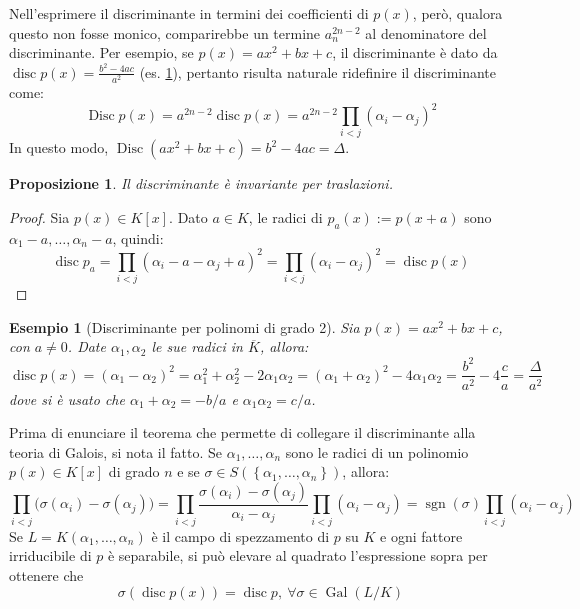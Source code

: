 \documentclass[12pt]{scrartcl}
\theoremstyle{style}
\newtheorem{esempio}{Esempio}[section]
\newtheorem{prop}{Proposizione}[section]
\numberwithin{equation}{subsection}
\begin{document}
Nell'esprimere il discriminante in termini dei coefficienti di $p(x)$, per\`o, qualora questo non fosse monico, comparirebbe un termine $a_n^{2n-2} $ al denominatore del discriminante.
Per esempio, se $p(x) = ax^2 + bx + c$, il discriminante \`e dato da $\operatorname{disc} p(x) = \frac{b^2 - 4ac}{a^2}$ (es. \ref{e36}), pertanto risulta naturale ridefinire il discriminante come:
\begin{equation}
	\operatorname{Disc} p(x) = a^{2n-2} \operatorname{disc} p(x) = a^{2n-2} \prod_{i<j} (\alpha _i-\alpha _j)^2
\end{equation}
In questo modo, $\operatorname{Disc} (ax^2 + bx+c) = b^2 - 4ac = \Delta $.
\begin{prop}
Il discriminante \`e invariante per traslazioni.
\end{prop}
\begin{proof}
	Sia $p(x) \in K[x]$. 
	Dato $a \in K$, le radici di $p_a(x) := p(x+a)$ sono $\alpha _1 - a, \ldots, \alpha _n-a$, quindi:
	\[
	\operatorname{disc} p_a = \prod_{i<j} (\alpha _i - a - \alpha _j + a)^2 = \prod_{i<j} (\alpha _i-\alpha _j)^2 = \operatorname{disc} p(x)
	\] 
\end{proof}
\begin{esempio}
	[Discriminante per polinomi di grado 2]\label{e36}
	Sia $p(x) =ax^2 + bx + c$, con $a\neq 0$.
	Date $\alpha _1, \alpha _2$ le sue radici in $\overline{K}$, allora:
	\[
	\operatorname{disc} p(x) = (\alpha _1-\alpha _2)^2 = \alpha _1^2 + \alpha _2^2 - 2 \alpha _1 \alpha _2 = (\alpha _1 + \alpha _2)^2 - 4 \alpha _1 \alpha _2 = \frac{b^2}{a^2}- 4 \frac{c}{a}=\frac{\Delta }{a^2}
	\] 
	dove si \`e usato che $\alpha _1 + \alpha _2 = -b /  a$ e $\alpha _1 \alpha _2 = c / a$.
\end{esempio}
\noindent Prima di enunciare il teorema che permette di collegare il discriminante alla teoria di Galois, si nota il fatto.
Se $\alpha _1,\ldots,\alpha _n$ sono le radici di un polinomio $p(x) \in K[x]$ di grado $n$ e se $\sigma \in S(\left\{ \alpha _1,\ldots,\alpha _n \right\} )$, allora:
\[
\prod_{i<j} \big(\sigma (\alpha _i)-\sigma (\alpha _j)\big) = \prod_{i<j} \frac{\sigma (\alpha _i) - \sigma (\alpha _j)}{\alpha _i-\alpha _j} \prod_{i<j} (\alpha _i-\alpha _j) = \operatorname{sgn} (\sigma ) \prod_{i<j} (\alpha _i-\alpha _j)
\] 
Se $L=K(\alpha _1,\ldots,\alpha _n)$ \`e il campo di spezzamento di $p$ su $K$ e ogni fattore irriducibile di $p$ \`e separabile, si pu\`o elevare al quadrato l'espressione sopra per ottenere che
\[
\sigma (\operatorname{disc} p(x)) = \operatorname{disc} p, \ \forall \sigma \in \operatorname{Gal}  (L / K)
\] 
\end{document}
